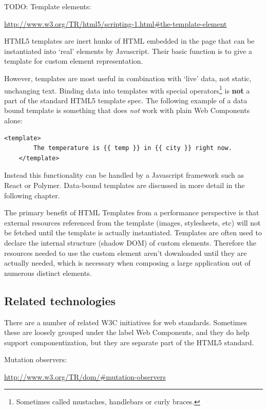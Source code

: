 TODO: Template elements:

\url{http://www.w3.org/TR/html5/scripting-1.html#the-template-element}

HTML5 templates are inert hunks of HTML embedded in the page that can be instantiated into `real' elements by Javascript.
Their basic function is to give a template for custom element representation.

However, templates are most useful in combination with `live' data, not static, unchanging text.
Binding data into templates with special operators\footnote{
Sometimes called mustaches, handlebars or curly braces. }
is \textbf{not} a part of the standard HTML5 template spec.
The following example of a data bound template is something that does \textit{not} work with plain Web Components alone:

\begin{lstlisting}[language=HTML5,numbers=none]
	<template> 
		The temperature is {{ temp }} in {{ city }} right now.
	</template>
\end{lstlisting}

Instead this functionality can be handled by a Javascript framework such as React or Polymer.
Data-bound templates are discussed in more detail in the following chapter.

The primary benefit of HTML Templates from a performance perspective is that external resources referenced from the template (images, stylesheets, etc) will not be fetched until the template is actually instantiated.
Templates are often used to declare the internal structure (shadow DOM) of custom elements. 
Therefore the resources needed to use the custom element aren't downloaded until they are actually needed, which is necessary when composing a large application out of numerous distinct elements.



\subsection{Related technologies}
There are a number of related W3C initiatives for web standards. 
Sometimes these are loosely grouped under the label Web Components,
and they do help support componentization, 
but they are separate part of the HTML5 standard.

Mutation observers:

\url{http://www.w3.org/TR/dom/#mutation-observers}

